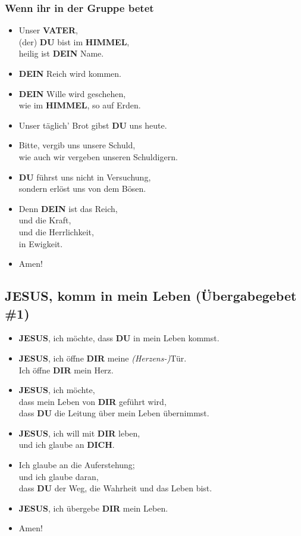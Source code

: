 \documentclass[10pt,a5paper]{article}
\newcommand{\Dein}[0]{\textbf{DEIN}}
\newcommand{\Dich}[0]{\textbf{DICH}}
\newcommand{\Dir}[0]{\textbf{DIR}}
\newcommand{\Du}[0]{\textbf{DU}}
\newcommand{\Himmel}[0]{\textbf{HIMMEL}}
\newcommand{\Jesus}[0]{\textbf{JESUS}}
\newcommand{\Vater}[0]{\textbf{VATER}}
\begin{document}
	\subsubsection{Wenn ihr in der Gruppe betet}
		\begin{itemize}[nosep]
			\item	Unser {\Vater},
			\\		(der) {\Du} bist im {\Himmel},
			\\		heilig ist {\Dein} Name.
			\item	{\Dein} Reich wird kommen.
			\item	{\Dein} Wille wird geschehen,
			\\		wie im {\Himmel},
					so auf Erden.
			\item	Unser t\"aglich' Brot gibst {\Du} uns heute.
			\item	Bitte,
					vergib uns unsere Schuld,
			\\		wie auch wir vergeben unseren Schuldigern.
			\item	{\Du} f\"uhrst uns nicht in Versuchung,
			\\		sondern erl\"ost uns von dem B\"osen.
			\item	Denn {\Dein} ist das Reich,
			\\		und die Kraft,
			\\		und die Herrlichkeit,
			\\		in Ewigkeit.
			\item	Amen!
		\end{itemize}

	\subsection{{\Jesus}, komm in mein Leben (\"Ubergabegebet \#1)}
		\begin{itemize}[nosep]
			\item	{\Jesus},
					ich m\"ochte,
					dass {\Du} in mein Leben kommst.
			\item	{\Jesus},
					ich \"offne {\Dir} meine \textit{(Herzens-)}T\"ur.
			\\		Ich \"offne {\Dir} mein Herz.
			\item	{\Jesus},
					ich m\"ochte,
			\\		dass mein Leben von {\Dir} gef\"uhrt wird,
			\\		dass {\Du} die Leitung \"uber mein Leben \"ubernimmst.
			\item	{\Jesus},
					ich will mit {\Dir} leben,
			\\		und ich glaube an {\Dich}.
			\item	Ich glaube an die Auferstehung;
			\\		und ich glaube daran,
			\\		dass {\Du} der Weg,
					die Wahrheit und das Leben bist.
			\item	{\Jesus},
					ich \"ubergebe {\Dir} mein Leben.
			\item	Amen!
		\end{itemize}
\end{document}
